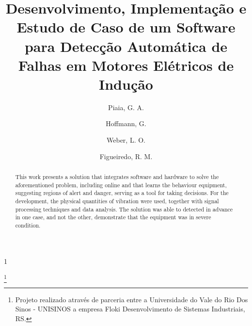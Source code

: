 \documentclass[a4paper]{ifacconf}
\def\portugues{1}
\def\portugues{0}
\begin{document}
	
	
\if\portugues1

% 
	
\begin{frontmatter}

\title{Desenvolvimento, Implementação e Estudo de Caso de um Software para Detecção Automática de Falhas em Motores Elétricos de Indução} 

\thanks[footnoteinfo]{Projeto realizado através de parceria entre a Universidade do Vale do Rio Dos Sinos - 
UNISINOS a empresa Floki Desenvolvimento de Sistemas Industriais, RS.}

\author[First]{Piaia, G. A.} 
\author[First]{Hoffmann, G.} 
\author[First]{Weber, L. O.}
\author[Second]{Figueiredo, R. M.}


\address[First]{Floki Desenvolvimento de Sistemas Industriais, RS (e-mails: piaia@flokisys.com; giu@flokisys.com; weber@flokisys.com).}
\address[Second]{Programa de Pós-Graduação em Engenharia Elétrica, Universidade do Vale do Rio Dos Sinos - 
UNISINOS, RS (e-mail: marquesf@unisinos.br).}


\renewcommand{\abstractname}{{\bf Abstract:~}}
\begin{abstract}                %
                        This work presents a solution that integrates software and hardware to solve the aforementioned problem,
                        including online and that learns the behaviour equipment, suggesting regions of alert and
                        danger, serving as a tool for taking decisions. For the development, the physical quantities of
                        vibration were used, together with signal processing techniques and data analysis. 
                        The solution was able to detected in advance in one case, and not the other, demonstrate that the equipment was in
                        severe condition.


\end{abstract}
\end{frontmatter}
\end{document}
